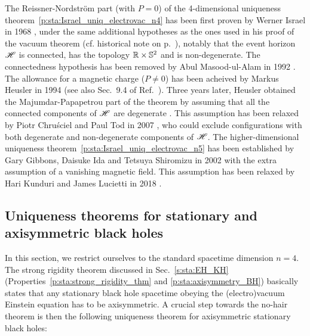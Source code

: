 \begin{hist}
\label{h:sta:Israel_thm_electrovac}
The Reissner-Nordström part (with $P=0$)
of the 4-dimensional uniqueness theorem~\ref{p:sta:Israel_uniq_electrovac_n4}
has been first proven by Werner Israel
in 1968 \cite{Israe68},
under the same additional hypotheses as the ones used in his proof of the vacuum
theorem (cf. historical note on p.~\pageref{h:sta:Israel_thm_vacuum}), notably
that the event horizon $\mathscr{H}$ is connected, has the topology $\mathbb{R}\times\mathbb{S}^2$ and is non-degenerate.
The connectedness hypothesis has been removed by
Abul Masood-ul-Alam in 1992 \cite{Masoo92}.
The allowance for a magnetic charge ($P\neq 0$) has been acheived by Markus Heusler in 1994 \cite{Heusl94} (see also Sec.~9.4 of Ref.~\cite{Heusl96}).
Three years later, Heusler obtained the Majumdar-Papapetrou part of the theorem
by assuming that all the connected components of $\mathscr{H}$ are degenerate \cite{Heusl97}.
This assumption has been relaxed by
Piotr Chru\'sciel and Paul Tod
in 2007 \cite{ChrusT07}, who could exclude configurations with both degenerate
and non-degenerate components of $\mathscr{H}$.
The higher-dimensional uniqueness theorem~\ref{p:sta:Israel_uniq_electrovac_n5}
has been established by Gary Gibbons, Daisuke Ida
and Tetsuya Shiromizu in 2002 \cite{GibboIS02a}
with the extra assumption of a vanishing magnetic field. This assumption
has been relaxed by Hari Kunduri and James Lucietti
in 2018 \cite{KunduL18}.
\end{hist}



\subsection{Uniqueness theorems for stationary and axisymmetric black holes}
\label{s:sta:uniqueness_axisym}

In this section, we restrict ourselves to the standard spacetime dimension $n=4$.
The strong rigidity theorem discussed in Sec.~\ref{s:sta:EH_KH} (Properties~\ref{p:sta:strong_rigidity_thm} and \ref{p:sta:axisymmetry_BH})
basically states that any stationary black hole spacetime obeying the (electro)vacuum Einstein
equation has to be axisymmetric.
A crucial step towards the no-hair theorem is then the following uniqueness theorem
for axisymmetric stationary black holes:

